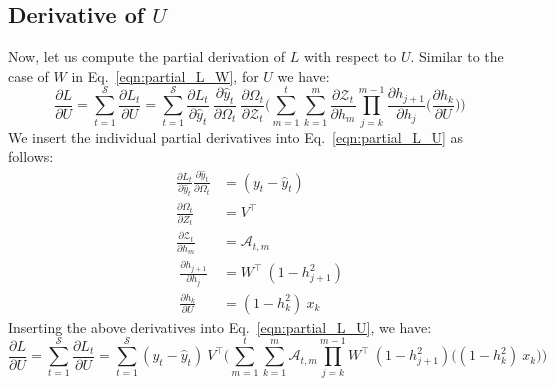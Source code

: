 \documentclass{article}
\begin{document}
\subsection{Derivative of $U$}
Now, let us compute the partial derivation of $L$ with respect to $U$. Similar to the case of $W$ in Eq.~\eqref{eqn:partial_L_W}, for $U$ we have:
\begin{equation}
\frac{\partial L}{ \partial{U}} = \sum_{t=1}^{\mathcal{S}} \frac{\partial L_t}{ \partial{U}} =
\sum_{t=1}^{\mathcal{S}}
\frac{\partial L_t}{\partial \hat{y}_t}~\frac{\partial \hat{y}_t}{\partial \Omega_t}~\frac{\partial \Omega_t}{ \partial \mathcal{Z}_t} \biggl( 
\sum_{m=1}^{t}
\sum_{k=1}^{m} \frac{\partial \mathcal{Z}_t}{ \partial h_m} 
\prod_{j=k}^{m-1} \frac{\partial h_{j+1}}{ \partial h_j} 
\biggl( \frac{\partial h_k}{ \partial U} \biggl) \biggl)
\label{eqn:partial_L_U}
\end{equation}
We insert the individual partial derivatives into Eq.~\eqref{eqn:partial_L_U} as follows:
\begin{align*}
        \frac{\partial L_t}{\partial \hat{y}_t}\frac{\partial \hat{y}_t}{\partial \Omega_t} &= (y_t - \hat{y}_t)\\
        \frac{\partial \Omega_t}{\partial Z_t}
        &= V^\top\\
        \frac{\partial \mathcal{Z}_t}{ \partial h_m}&= \mathcal{A}_{t,m} \\
        ~\frac{\partial h_{j+1}}{\partial h_{j}}
        &= W^\top ~ (1 - h_{j+1}^2) \\
        ~\frac{\partial h_k}{\partial U}&= (1-h_k^2)~ x_{k}
\end{align*}
Inserting the above derivatives into Eq.~\eqref{eqn:partial_L_U}, we have:
\begin{equation}
	\frac{\partial L}{ \partial{U}} = \sum_{t=1}^{\mathcal{S}} \frac{\partial L_t}{ \partial{U}} =
\sum_{t=1}^{\mathcal{S}}
(y_t - \hat{y}_t)~V^\top \biggl( 
\sum_{m=1}^{t}
\sum_{k=1}^{m} \mathcal{A}_{t,m} 
\prod_{j=k}^{m-1} W^\top ~ (1 - h_{j+1}^2)
\biggl( (1-h_k^2)~ x_{k} \biggl) \biggl)
 \label{eqn:partial_L_aW}
\end{equation}
\end{document}

